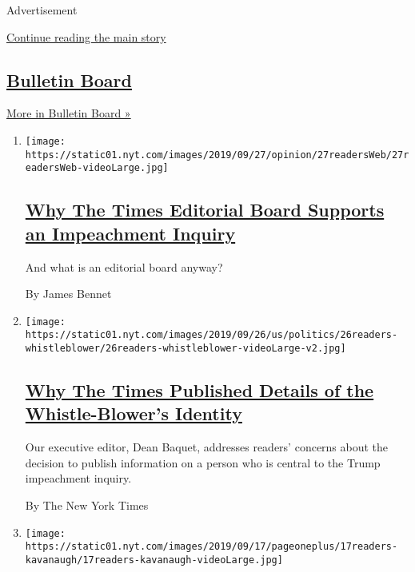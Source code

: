 Advertisement

\protect\hyperlink{after-mid2}{Continue reading the main story}

\hypertarget{bulletin-board}{%
\subsection{\texorpdfstring{\href{/series/bulletin-board}{Bulletin
Board}}{Bulletin Board}}\label{bulletin-board}}

\href{/series/bulletin-board}{More in Bulletin Board »}

\begin{enumerate}
\def\labelenumi{\arabic{enumi}.}
\item
  \texttt{[image: https://static01.nyt.com/images/2019/09/27/opinion/27readersWeb/27readersWeb-videoLarge.jpg]}

  \hypertarget{why-the-times-editorial-board-supports-an-impeachment-inquiry}{%
  \subsection{\texorpdfstring{\href{/2019/09/27/reader-center/impeachment-editorial-board.html}{Why
  The Times Editorial Board Supports an Impeachment
  Inquiry}}{Why The Times Editorial Board Supports an Impeachment Inquiry}}\label{why-the-times-editorial-board-supports-an-impeachment-inquiry}}

  And what is an editorial board anyway?

  By James Bennet
\item
  \texttt{[image: https://static01.nyt.com/images/2019/09/26/us/politics/26readers-whistleblower/26readers-whistleblower-videoLarge-v2.jpg]}

  \hypertarget{why-the-times-published-details-of-the-whistle-blowers-identity}{%
  \subsection{\texorpdfstring{\href{/2019/09/26/reader-center/whistle-blower-identity.html}{Why
  The Times Published Details of the Whistle-Blower's
  Identity}}{Why The Times Published Details of the Whistle-Blower's Identity}}\label{why-the-times-published-details-of-the-whistle-blowers-identity}}

  Our executive editor, Dean Baquet, addresses readers' concerns about
  the decision to publish information on a person who is central to the
  Trump impeachment inquiry.

  By The New York Times
\item
  \texttt{[image: https://static01.nyt.com/images/2019/09/17/pageoneplus/17readers-kavanaugh/17readers-kavanaugh-videoLarge.jpg]}


\end{enumerate}
